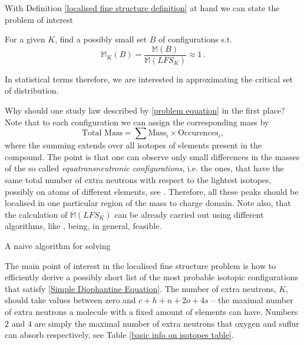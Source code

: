 
With Definition \ref{localised fine structure definition} at hand we can state the problem of interest

\begin{Problem}
	For a given $K$, find a possibly small set $B$ of configurations s.t. 
	\begin{equation}\label{problem equation}
		\mathbb{M}_K (B) = \frac{ \mathbb{M}(B) }{ \mathbb{M}( LFS_K ) } \approx 1\,.	
	\end{equation} 
\end{Problem}


In statistical terms therefore, we are interested in approximating the critical set of distribution. 


Why should one study law described by \eqref{problem equation} in the first place? Note that to each configuration we can assign the corresponding mass by 
\begin{equation*}
	\text{Total Mass} = \sum \text{Mass}_i \times \text{Occurences}_i, 
\end{equation*}
where the summing extends over all isotopes of elements present in the compound. The point is that one can observe only small differences in the masses of the so called {\it equatransneutronic configurations}, i.e. the ones, that have the same total number of extra neutrons with respect to the lightest isotopes, possibly on atoms of different elements, see \cite{Olson2009Calculations}. Therefore, all these peaks should be localised in one particular region of the mass to charge domain. Note also, that the calculation of $\mathbb{M}( LFS_K )$ can be already carried out using different algorithms, like \cite{Claesen2012Efficient}, being, in general, feasible. 


A naive algorithm for solving 


The main point of interest in the localised fine structure problem is how to efficiently derive a possibly short list of the most probable isotopic configurations that satisfy \eqref{Simple Diophantine Equation}. The number of extra neutrons, $K$, should take values between zero and $c + h + n + 2o + 4s$ -- the maximal number of extra neutrons a molecule with a fixed amount of elements can have. Numbers $2$ and $4$ are simply the maximal number of extra neutrons that oxygen and suflur can absorb respectively, see Table \ref{basic info on isotopes table}.


